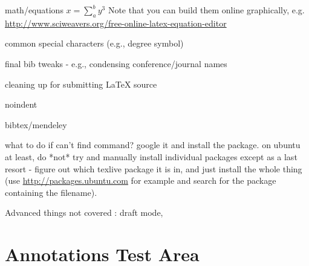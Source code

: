 \documentclass{sigchi}
\begin{document}
math/equations $x= \sum_a^b y^3$ Note that you can build them online graphically, e.g. \url{http://www.sciweavers.org/free-online-latex-equation-editor}

common special characters (e.g.,  degree symbol)

final bib tweaks - e.g., condensing conference/journal names

cleaning up for submitting LaTeX source

noindent

bibtex/mendeley

what to do if can't find command? google it and install the package. on ubuntu at least, do *not* try and manually install individual packages except as a last resort - figure out which texlive package it is in, and just install the whole thing (use \url{http://packages.ubuntu.com} for example and search for the package containing the filename).

Advanced things not covered : draft mode, 

\section{Annotations Test Area}
%
%
%
%
%
\balance{}



\end{document}
